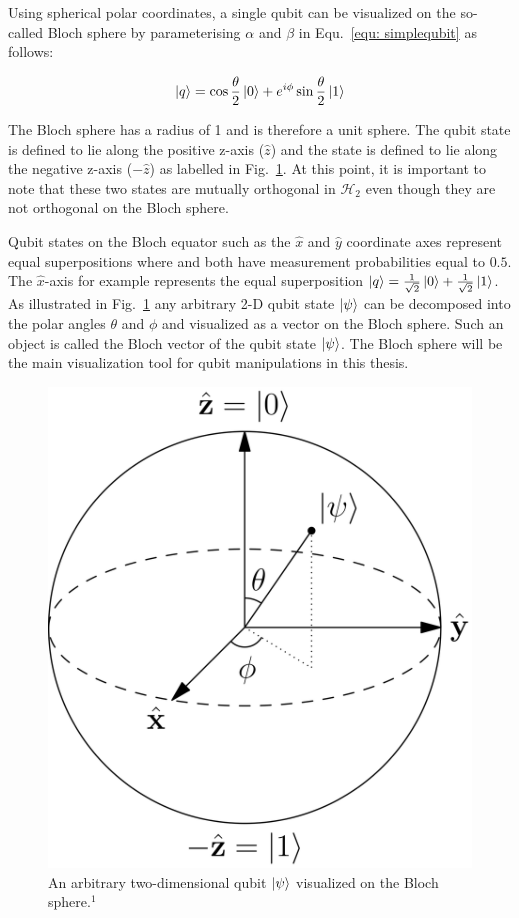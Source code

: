 Using spherical polar coordinates, a single qubit can be visualized on the so-called Bloch sphere by parameterising $\alpha$ and $\beta$ in Equ.~\ref{equ: simplequbit} as follows:

\begin{equation}
\label{equ: blochqubit}
\ket{q} = \cos\frac{\theta}{2} \ket{0} + e^{i \phi} \sin\frac{\theta}{2} \ket{1}
\end{equation}

The Bloch sphere has a radius of 1 and is therefore a unit sphere. The \0 qubit state is defined to lie along the positive z-axis ($\hat{z}$) and the \1 state is defined to lie along the negative z-axis ($-\hat{z}$) as labelled in Fig.~\ref{fig:blochsphere}. At this point, it is important to note that these two states are mutually orthogonal in $\mathcal{H}_{2}$ even though they are not orthogonal on the Bloch sphere. 

Qubit states on the Bloch equator such as the $\hat{x}$ and $\hat{y}$ coordinate axes represent equal superpositions where \0 and \1 both have measurement probabilities equal to $0.5$. The $\hat{x}$-axis for example represents the equal superposition $\ket{q} = \frac{1}{\sqrt{2}} \ket{0} + \frac{1}{\sqrt{2}} \ket{1}$. As illustrated in Fig.~\ref{fig:blochsphere} any arbitrary 2-D qubit state $\ket{\psi}$ can be decomposed into the polar angles $\theta$ and $\phi$ and visualized as a vector on the Bloch sphere. Such an object is called the Bloch vector of the qubit state $\ket{\psi}$. The Bloch sphere will be the main visualization tool for qubit manipulations in this thesis.

\begin{figure}[!ht]
       \centering
       \includegraphics[scale=0.07]{img/blochsphere.png}
       \caption{\label{fig:blochsphere} An arbitrary two-dimensional qubit $\ket{\psi}$ visualized on the Bloch sphere.$^{1}$}
\end{figure}

